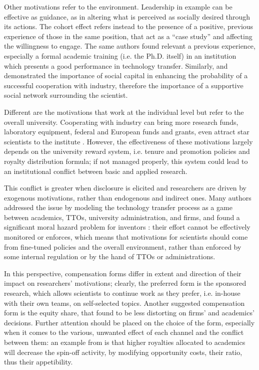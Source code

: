 Other motivations refer to the environment. Leadership in example can be effective as guidance, as in altering what is perceived as socially desired through its actions. The cohort effect \citep{Bercovitz2006} refers instead to the presence of a positive, previous experience of those in the same position, that act as a \enquote{case study} and affecting the willingness to engage. The same authors found relevant a previous experience, especially a formal academic training (i.e. the Ph.D. itself) in an institution which presents a good performance in technology transfer. Similarly, \citet{Murray2004} and \citet{Link2007} demonstrated the importance of social capital in enhancing the probability of a successful cooperation with industry, therefore the importance of a supportive social network surrounding the scientist.

Different are the motivations that work at the individual level but refer to the overall university. Cooperating with industry can bring more research funds, laboratory equipment, federal and European funds and grants, even attract star scientists to the institute \citep{OShea2004, Baldini2007, DEste2007}. However, the effectiveness of these motivations largely depends on the university reward system, i.e. tenure and promotion policies and royalty distribution formula; if not managed properly, this system could lead to an institutional conflict between basic and applied research. 

This conflict is greater when disclosure is elicited and researchers are driven by exogenous motivations, rather than endogenous and indirect ones. Many authors addressed the issue by modeling the technology transfer process as a game between academics, TTOs, university administration, and firms, and found a significant moral hazard problem for inventors \citep{Jensen1998}: their effort cannot be effectively monitored or enforces, which means that motivations for scientists should come from fine-tuned policies and the overall environment, rather than enforced by some internal regulation or by the hand of TTOs or administrations. 

In this perspective, compensation forms differ in extent and direction of their impact on researchers' motivations; clearly, the preferred form is the sponsored research, which allows scientists to continue work as they prefer, i.e. in-house with their own teams, on self-selected topics. Another suggested compensation form is the equity share, that \citet{Jensen1998} found to be less distorting on firms' and academics' decisions. Further attention should be placed on the choice of the form, especially when it comes to the various, unwanted effect of each channel and the conflict between them: an example from \citet{OShea2004} is that higher royalties allocated to academics will decrease the spin-off activity, by modifying opportunity costs, their ratio, thus their appetibility.

